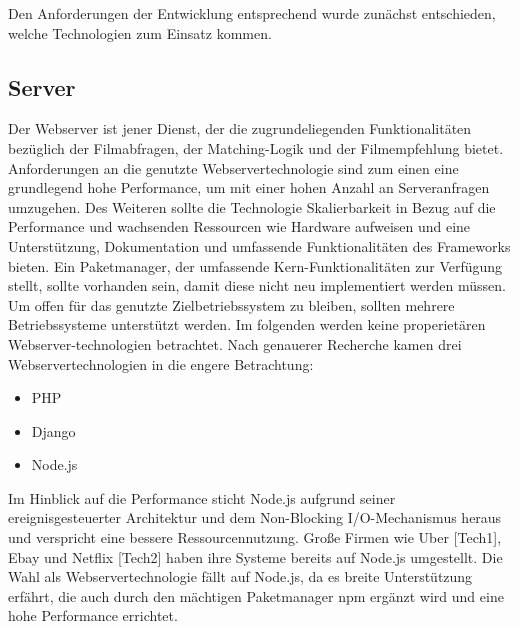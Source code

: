 Den Anforderungen der Entwicklung entsprechend wurde zunächst entschieden, welche Technologien zum Einsatz kommen. 


\subsection{Server}
\label{sec:server}
Der Webserver ist jener Dienst,  der die zugrundeliegenden Funktionalitäten bezüglich der Filmabfragen, der Matching-Logik und der Filmempfehlung bietet. 
Anforderungen an die genutzte Webservertechnologie sind zum einen eine grundlegend hohe Performance, um mit einer hohen Anzahl an Serveranfragen umzugehen. Des Weiteren sollte die Technologie Skalierbarkeit in Bezug auf die Performance und wachsenden Ressourcen wie Hardware aufweisen und eine Unterstützung, Dokumentation und umfassende Funktionalitäten des Frameworks bieten. 
Ein Paketmanager, der umfassende Kern-Funktionalitäten zur Verfügung stellt, sollte vorhanden sein, damit diese nicht neu implementiert werden müssen. Um offen für das genutzte Zielbetriebssystem zu bleiben, sollten mehrere Betriebssysteme unterstützt werden. 
Im folgenden werden keine properietären Webserver-technologien betrachtet.
\newline
Nach genauerer Recherche kamen drei Webservertechnologien in die engere Betrachtung:

\begin{itemize}
	\item PHP
	\item Django
	\item Node.js
\end{itemize} 

Im Hinblick auf die Performance sticht Node.js aufgrund seiner ereignisgesteuerter Architektur  und dem Non-Blocking I/O-Mechanismus heraus und verspricht eine bessere Ressourcennutzung. 
\newline
Große Firmen wie Uber [Tech1], Ebay und Netflix [Tech2] haben ihre Systeme bereits auf Node.js umgestellt. Die Wahl als Webservertechnologie fällt auf Node.js, da es breite Unterstützung erfährt, die auch durch den mächtigen Paketmanager npm ergänzt wird und eine hohe Performance errichtet.


